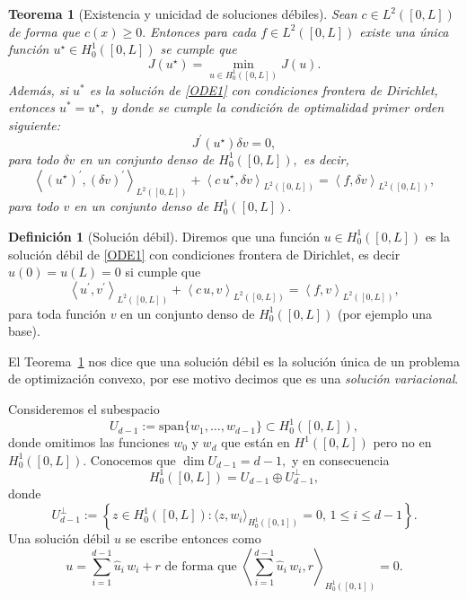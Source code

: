 \documentclass[10pt,handout]{beamer}
\theoremstyle{plain} %
\newtheorem{thm}{Teorema}
\theoremstyle{plain} %
\theoremstyle{plain} %
\theoremstyle{plain} %
\theoremstyle{definition}
\newtheorem{defn}{Definici\'on}
\theoremstyle{example}
\theoremstyle{example}
\theoremstyle{remark}
\theoremstyle{remark}
\begin{document}
\begin{frame}
\begin{thm}[Existencia y unicidad de soluciones débiles]\label{thm1}
Sean $c \in L^2([0,L])$ de forma que $c(x) \ge 0.$ Entonces para cada $f \in L^2([0,L])$ 
existe una única función $u^{\star} \in H_0^1([0,L])$ se cumple que
$$
J(u^{\star}) = \min_{u \in H_0^1([0,L])}J(u).
$$
Además, si $u^*$ es la solución de \eqref{ODE1} con condiciones frontera de Dirichlet, 
entonces $u^*=u^{\star},$ y donde se cumple la condición de optimalidad primer orden
siguiente:
\begin{equation}
J^{\prime}(u^{\star}) \delta v = 0, \label{optim1}
\end{equation}
para todo $\delta v$ en un conjunto denso de $H_0^1([0,L]),$ es decir,
\begin{equation}
\left\langle  (u^{\star})^{\prime} , (\delta v)^{\prime} \right\rangle_{L^2([0,L])}  + \left\langle  c\,u^{\star}, \delta v \right\rangle_{L^2([0,L])} =  \left\langle f, \delta v \right\rangle_{L^2([0,L])},
\end{equation}
para todo $v$ en un conjunto denso de $H_0^1([0,L]).$
\end{thm}
\end{frame}

\begin{frame}
\begin{defn}[Solución débil]
Diremos que una función $u \in H_0^1([0,L])$ es la solución débil de \eqref{ODE1} con condiciones frontera de Dirichlet, es decir $u(0)=u(L)=0$ si cumple que
\begin{equation}
\left\langle  u^{\prime} , v^{\prime} \right\rangle_{L^2([0,L])}  + \left\langle  c\,u, v \right\rangle_{L^2([0,L])} =  \left\langle f, v \right\rangle_{L^2([0,L])},
\end{equation}
para toda función $v$ en un conjunto denso de $H_{0}^1([0,L])$ (por ejemplo una base).
\end{defn}
El Teorema~\ref{thm1} nos dice que una solución débil es la solución única de un problema de optimización convexo, por ese motivo decimos que es una \emph{solución variacional}.
\end{frame}

\begin{frame}
Consideremos el subespacio 
$$
U_{d-1} := \mathrm{span}\{w_1,\ldots,w_{d-1}\} \subset H_0^1([0,L]),
$$
donde omitimos las funciones $w_0$ y $w_d$ que están en $H^1([0,L])$ pero no en $H_0^1([0,L]).$ Conocemos
que $\dim U_{d-1}=d-1,$ y en consecuencia
$$
 H_0^1([0,L]) = U_{d-1} \oplus U_{d-1}^{\bot},
$$
donde
$$
U_{d-1}^{\bot} := \left\{
z \in H_0^1([0,L]): \langle z,w_i \rangle_{H_0^1([0,1])} = 0, \, 1 \le i \le d-1
\right\}.
$$
Una solución débil $u$ se escribe entonces como
$$
u = \sum_{i=1}^{d-1} \widehat{u}_i \, w_i + r  \text{ de forma que } \left\langle 
 \sum_{i=1}^{d-1} \widehat{u}_i \, w_i, r
\right\rangle_{H_0^1([0,1])}  = 0.
$$
\end{frame}
\end{document}
